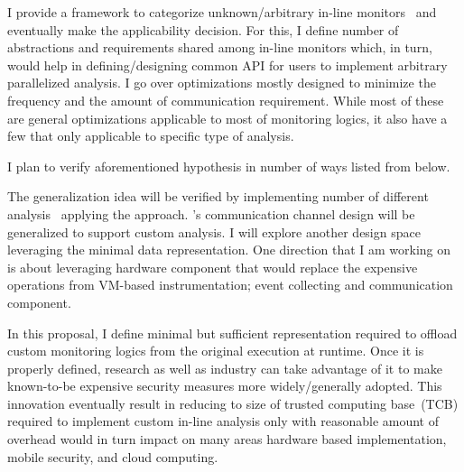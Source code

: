 %
I provide a framework to categorize unknown/arbitrary in-line
monitors~\cite{CAB} and eventually make the applicability decision.
%
For this, I define number of abstractions and requirements shared among in-line
monitors  which, in turn, would help in defining/designing common API for users
to implement arbitrary parallelized analysis.
%
I go over \SR optimizations mostly designed to minimize the frequency and the
amount of communication requirement. While most of these are general
optimizations applicable to most of monitoring logics, it also have a few that
only applicable to specific type of analysis.

I plan to verify aforementioned hypothesis in number of ways listed from below.

The generalization idea will be verified by implementing number of different
analysis~\cite{memcheck, cfi} applying the approach.
%
\SR's communication channel design will be generalized to support custom
analysis.
%
I will explore another design space leveraging the minimal data representation.
One direction that I am working on is about leveraging hardware component that
would replace the expensive operations from VM-based instrumentation; event
collecting and communication component.


In this proposal, I define minimal but sufficient representation required to
offload custom monitoring logics from the original execution at runtime. Once
it is properly defined, research as well as industry can take advantage of it
to make known-to-be expensive security measures more widely/generally adopted.
%
This innovation eventually result in reducing to size of trusted computing
base~(TCB) required to implement custom in-line analysis only with reasonable
amount of overhead would in turn impact on many areas hardware based
implementation, mobile security, and cloud computing. 
